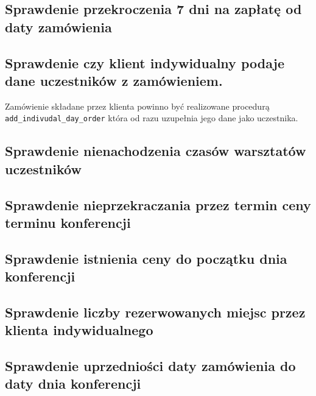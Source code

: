 \documentclass[12pt]{article}
\begin{document}
\subsection{Sprawdenie przekroczenia 7 dni na zapłatę od daty zamówienia}


\subsection{Sprawdenie czy klient indywidualny podaje dane uczestników z zamówieniem.}
Zamówienie składane przez klienta powinno być realizowane procedurą \texttt{add\_indivudal\_day\_order} która od razu uzupełnia jego dane jako uczestnika.


\subsection{Sprawdenie nienachodzenia czasów warsztatów uczestników}


\subsection{Sprawdenie nieprzekraczania przez termin ceny terminu konferencji}




\subsection{Sprawdenie istnienia ceny do początku dnia konferencji}



\subsection{Sprawdenie liczby rezerwowanych miejsc przez klienta indywidualnego}


\subsection{Sprawdenie uprzedniości daty zamówienia do daty dnia konferencji}

\end{document}
